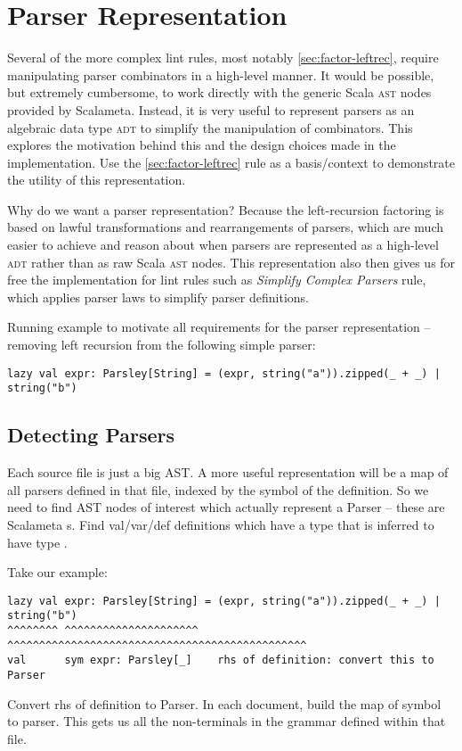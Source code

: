 \documentclass[../../main.tex]{subfiles}
\begin{document}
\section{Parser Representation}\label{sec:parser-representation}
Several of the more complex lint rules, most notably \cref{sec:factor-leftrec}, require manipulating parser combinators in a high-level manner.
It would be possible, but extremely cumbersome, to work directly with the generic Scala \textsc{ast} nodes provided by Scalameta.
Instead, it is very useful to represent parsers as an algebraic data type \textsc{adt} to simplify the manipulation of combinators.
This  explores the motivation behind this and the design choices made in the implementation.
Use the \cref{sec:factor-leftrec} rule as a basis/context to demonstrate the utility of this representation.

Why do we want a parser representation? Because the left-recursion factoring is based on lawful transformations and rearrangements of parsers,
which are much easier to achieve and reason about when parsers are represented as a high-level \textsc{adt} rather than as raw Scala \textsc{ast} nodes.
This representation also then gives us for free the implementation for lint rules such as \emph{Simplify Complex Parsers} rule, which applies parser laws to simplify parser definitions.

Running example to motivate all requirements for the parser representation -- removing left recursion from the following simple parser:
\begin{verbatim}
lazy val expr: Parsley[String] = (expr, string("a")).zipped(_ + _) | string("b")
\end{verbatim}

\subsection{Detecting Parsers} %
Each source file is just a big AST.
A more useful representation will be a map of all parsers defined in that file, indexed by the symbol of the definition.
So we need to find AST nodes of interest which actually represent a Parser -- these are Scalameta s.
Find val/var/def definitions which have a type that is inferred to have type .

Take our example:
\begin{verbatim}
lazy val expr: Parsley[String] = (expr, string("a")).zipped(_ + _) | string("b")
^^^^^^^^ ^^^^^^^^^^^^^^^^^^^^^   ^^^^^^^^^^^^^^^^^^^^^^^^^^^^^^^^^^^^^^^^^^^^^^^
val      sym expr: Parsley[_]    rhs of definition: convert this to Parser
\end{verbatim}
Convert rhs of definition to Parser.
In each document, build the map of symbol to parser.
This gets us all the non-terminals in the grammar defined within that file.
\end{document}
